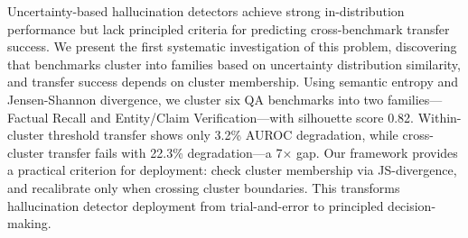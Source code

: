 Uncertainty-based hallucination detectors achieve strong in-distribution performance but lack principled criteria for predicting cross-benchmark transfer success. We present the first systematic investigation of this problem, discovering that benchmarks cluster into families based on uncertainty distribution similarity, and transfer success depends on cluster membership. Using semantic entropy and Jensen-Shannon divergence, we cluster six QA benchmarks into two families---Factual Recall and Entity/Claim Verification---with silhouette score 0.82. Within-cluster threshold transfer shows only 3.2\% AUROC degradation, while cross-cluster transfer fails with 22.3\% degradation---a 7$\times$ gap. Our framework provides a practical criterion for deployment: check cluster membership via JS-divergence, and recalibrate only when crossing cluster boundaries. This transforms hallucination detector deployment from trial-and-error to principled decision-making.
